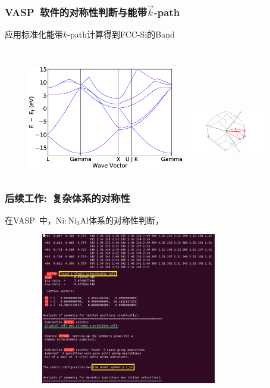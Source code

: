 \documentclass[cjk,slidestop,handout,compress,mathserif,blue]{beamer}	%
\begin{document}
\frame
{
	\frametitle{\textrm{VASP~}软件的对称性判断与能带$\vec k$-\textrm{path}}
	应用标准化能带$k$-\textrm{path}计算得到\textrm{FCC-Si}的\textrm{Band}\\{\fontsize{7.3pt}{6.2pt}}\\

\begin{figure}[h!]
\centering
\vspace*{-0.1in}
\includegraphics[height=2.0in,width=2.7in,viewport=0 0 890 570,clip]{Figures/FCC_Si-Band_pymatgen.eps}
\hspace*{0.01in}
\includegraphics[height=1.5in,width=1.4in,viewport=280 0 850 600,clip]{Figures/FCC_Si-Brillouin-zone.png}
\caption{\fontsize{7.2pt}{4.2pt}}%
\label{FCC_Si-Band}
\end{figure} 
}

\frame
{
	\frametitle{后续工作:~复杂体系的对称性}
	在\textrm{VASP~}中，$\mathrm{Ni}:\mathrm{Ni}_3\mathrm{Al}$体系的对称性判断，
\begin{figure}[h!]
\centering
\includegraphics[height=2.6in,width=3.5in,viewport=0 0 680 530,clip]{Figures/VASP_Alloy_Ni-Al_symmetry.png}
\label{Alloy_Ni-Al-OUTCAR}
\end{figure} 
}
\end{document}
